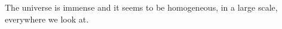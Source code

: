 \documentclass{article}
\begin{document}
The universe is immense and it seems to be homogeneous, 
in a large scale, everywhere we look at.



    








\end{document}
